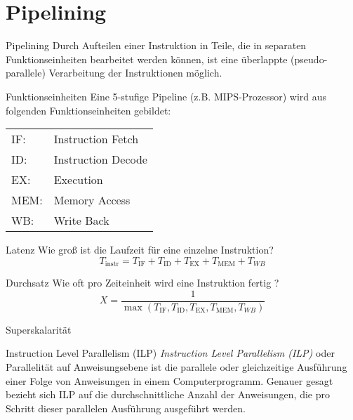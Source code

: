 
\section{Pipelining}

\begin{defi}{Pipelining}
    Durch Aufteilen einer Instruktion in Teile, 
    die in separaten Funktionseinheiten bearbeitet werden können, 
    ist eine überlappte (pseudo-parallele) Verarbeitung der Instruktionen möglich.
\end{defi}

\begin{defi}[Pipelining]{Funktionseinheiten}
    Eine 5-stufige Pipeline (z.B. MIPS-Prozessor) wird aus folgenden Funktionseinheiten gebildet:
    \begin{center}
        \begin{tabular}{ll}
            IF:  & Instruction Fetch  \\
            ID:  & Instruction Decode \\
            EX:  & Execution          \\
            MEM: & Memory Access      \\
            WB:  & Write Back         \\
        \end{tabular}
    \end{center}
\end{defi}

\begin{defi}[Pipelining]{Latenz}
    Wie groß ist die Laufzeit für eine einzelne Instruktion?
    \[T_\text{instr} = T_\text{IF} + T_\text{ID} + T_\text{EX} + T_\text{MEM} + T_{WB}\]
\end{defi}

\begin{defi}[Pipelining]{Durchsatz}
    Wie oft pro Zeiteinheit wird eine Instruktion fertig ?
    \[X = \frac{1}{\max(T_\text{IF}, T_\text{ID}, T_\text{EX}, T_\text{MEM}, T_{WB})}\]
\end{defi}

\begin{defi}{Superskalarität}
    
\end{defi}

\begin{defi}{Instruction Level Parallelism (ILP)}\label{defi:ilp}
    \emph{Instruction Level Parallelism (ILP)} oder Parallelität auf Anweisungsebene ist die parallele oder gleichzeitige Ausführung einer Folge von Anweisungen in einem Computerprogramm. 
    Genauer gesagt bezieht sich ILP auf die durchschnittliche Anzahl der Anweisungen, die pro Schritt dieser parallelen Ausführung ausgeführt werden.
\end{defi}

